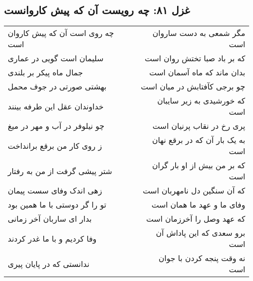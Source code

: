 \begin{center}
\section*{غزل ۸۱: چه رویست آن که پیش کاروانست}
\label{sec:081}
\begin{longtable}{l p{0.5cm} r}
چه روی است آن که پیش کاروان است
&&
مگر شمعی به دست ساروان است
\\
سلیمان است گویی در عماری
&&
که بر باد صبا تختش روان است
\\
جمال ماه پیکر بر بلندی
&&
بدان ماند که ماه آسمان است
\\
بهشتی صورتی در جوف محمل
&&
چو برجی کآفتابش در میان است
\\
خداوندان عقل این طرفه بینند
&&
که خورشیدی به زیر سایبان است
\\
چو نیلوفر در آب و مهر در میغ
&&
پری رخ در نقاب پرنیان است
\\
ز روی کار من برقع برانداخت
&&
به یک بار آن که در برقع نهان است
\\
شتر پیشی گرفت از من به رفتار
&&
که بر من بیش از او بار گران است
\\
زهی اندک وفای سست پیمان
&&
که آن سنگین دل نامهربان است
\\
تو را گر دوستی با ما همین بود
&&
وفای ما و عهد ما همان است
\\
بدار ای ساربان آخر زمانی
&&
که عهد وصل را آخرزمان است
\\
وفا کردیم و با ما غدر کردند
&&
برو سعدی که این پاداش آن است
\\
ندانستی که در پایان پیری
&&
نه وقت پنجه کردن با جوان است
\\
\end{longtable}
\end{center}
